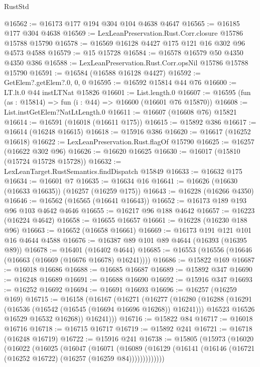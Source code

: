 \begin{lexlean}{RustStd}
\begin{coremodule}
@16562 := @16173 @177 @194 @304 @104 @4638 @4647
@16565 := @16185 @177 @304 @4638
@16569 := LexLeanPreservation.Rust.Corr.closure @15786 @15788 @15790
@16578 := @16569 @16128 @4427 @175 @121 @16 @302 @96 @4573 @4588
@16579 := @15 @15728
@16584 := @16578 @16579 @50 @4350 @4350 @386
@16588 := LexLeanPreservation.Rust.Corr.opsNil @15786 @15788 @15790
@16591 := @16584 (@16588 @16128 @4427)
@16592 := GetElem?.getElem?.{0, 0, 0}
@16595 := @16592 @15814 @44 @76
@16600 := LT.lt.{0} @44 instLTNat @15826
@16601 := List.length.{0}
@16607 := @16595 (fun (as : @15814) => fun (i : @44) => @16600 (@16601 @76 @15870))
@16608 := List.instGetElem?NatLtLength.{0}
@16611 := @16607 (@16608 @76) @15821
@16614 := @16591 (@16018 (@16611 @175))
@16615 := @15892 @386
@16617 := @16614 (@16248 @16615)
@16618 := @15916 @386
@16620 := @16617 (@16252 @16618)
@16622 := LexLeanPreservation.Rust.flagOf @15790
@16625 := @16257 (@16622 @302 @96)
@16626 := @16620 @16625
@16630 := @16017 (@15810 (@15724 @15728 @15728))
@16632 := LexLeanTarget.RustSemantics.findDispatch @15849
@16633 := @16632 @175
@16634 := @16601 @7
@16635 := @16634 @16
@16641 := @16626 (@16630 (@16633 @16635)) (@16257 (@16259 @175))
@16643 := @16228 (@16266 @4350)
@16646 := @16562 (@16565 (@16641 @16643))
@16652 := @16173 @189 @193 @96 @103 @4642 @4646
@16655 := @16217 @96 @188 @4642
@16657 := @16223 (@16224 @4642)
@16658 := @16655 @16657
@16661 := @16228 (@16230 @188 @96)
@16663 := @16652 (@16658 @16661)
@16669 := @16173 @191 @121 @101 @16 @4644 @4588
@16676 := @16387 @89 @101 @89 @4644 (@16393 (@16395 @89))
@16678 := @16401 (@16402 @4644)
@16685 := @16553 (@16556 (@16646 (@16663 (@16669 (@16676 @16678) @16241))))
@16686 := @15822 @169
@16687 := @16018 @16686
@16688 := @16685 @16687
@16689 := @15892 @347
@16690 := @16248 @16689
@16691 := @16688 @16690
@16692 := @15916 @347
@16693 := @16252 @16692
@16694 := @16691 @16693
@16696 := @16257 (@16259 @169)
@16715 := @16158
    (@16167
      (@16271
        (@16277
          (@16280
            (@16288
              (@16291 (@16536 (@16542 (@16545 (@16694 @16696 @16268)) @16241)))
              @16523
              @16526
              @16529
              @16532
              @16268))
          @16241)))
@16716 := @15822 @84
@16717 := @16018 @16716
@16718 := @16715 @16717
@16719 := @15892 @241
@16721 := @16718 (@16248 @16719)
@16722 := @15916 @241
@16738 := @15805
    (@15973
      (@16020
        (@16022
          (@16025
            (@16047
              (@16071
                (@16089
                  (@16129 (@16141 (@16146 (@16721 (@16252 @16722) (@16257 (@16259 @84)))))))))))))

\end{coremodule}
\end{lexlean}
